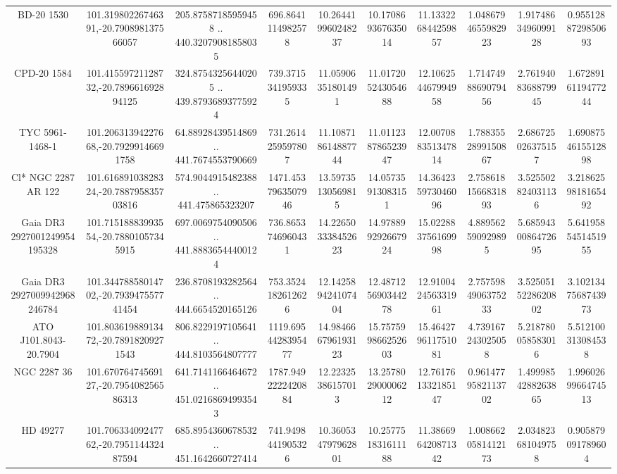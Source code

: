\begin{table}
\begin{tabular}{cccccccccc}
BD-20  1530 & 101.31980226746391,-20.790898137566057 & 205.87587185959458 .. 440.32079081858035 & 696.8641114982578 & 10.264419960248237 & 10.170869367635014 & 11.133226844259857 & 1.0486794655982923 & 1.9174863496099128 & 0.9551288729850693 \\
CPD-20  1584 & 101.41559721128732,-20.789661692894125 & 324.87543256440205 .. 439.87936893775924 & 739.3715341959335 & 11.05906351801491 & 11.017205243054688 & 12.106254467994958 & 1.7147498869079456 & 2.7619408368879945 & 1.6728916119477244 \\
TYC 5961-1468-1 & 101.20631394227668,-20.79299146691758 & 64.88928439514869 .. 441.7674553790669 & 731.2614259597807 & 11.108718614887744 & 11.011238786523947 & 12.007088351347814 & 1.7883552899150867 & 2.686725026375157 & 1.6908754615512898 \\
Cl* NGC 2287     AR     122 & 101.61689103828324,-20.788795835703816 & 574.9044915482388 .. 441.475865323207 & 1471.4537963507946 & 13.59735130569815 & 14.05735913083151 & 14.364235973046096 & 2.7586181566831893 & 3.525502824031136 & 3.2186259818165492 \\
Gaia DR3 2927001249954195328 & 101.71518883993554,-20.78801057345915 & 697.0069754090506 .. 441.88836544400124 & 736.8653746960431 & 14.226503338452623 & 14.978899292667924 & 15.022883756169998 & 4.889562590929895 & 5.6859430086472695 & 5.6419585451451955 \\
Gaia DR3 2927009942968246784 & 101.34478858014702,-20.793947557741454 & 236.8708193282564 .. 444.6654520165126 & 753.3524182612626 & 12.142589424107404 & 12.487125690344278 & 12.910042456331961 & 2.7575984906375233 & 3.5250515228620802 & 3.1021347568743973 \\
ATO J101.8043-20.7904 & 101.80361988913472,-20.78918209271543 & 806.8229197105641 .. 444.8103564807777 & 1119.6954428395477 & 14.984666796193123 & 15.757599866252603 & 15.464279611751081 & 4.739167243025058 & 5.218780058583016 & 5.512100313084538 \\
NGC  2287    36 & 101.67076474569127,-20.795408256586313 & 641.7141166464672 .. 451.02168694993543 & 1787.9492222420884 & 12.22325386157013 & 13.257802900006212 & 12.761761332185147 & 0.9614779582113702 & 1.4999854288263865 & 1.9960269966474513 \\
HD  49277 & 101.70633409247762,-20.795114432487594 & 685.8954360678532 .. 451.1642660727414 & 741.9498441905326 & 10.360534797962801 & 10.257751831611188 & 11.386696420871342 & 1.0086620581412173 & 2.034823681049758 & 0.905879091789604 \\

\end{tabular}
\end{table}
